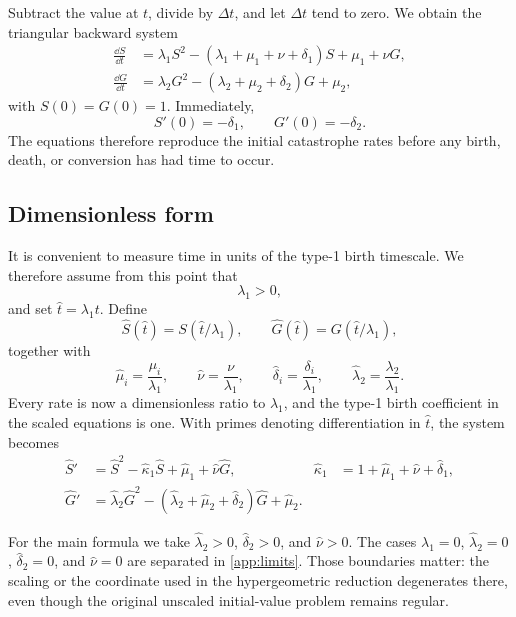 Subtract the value at $t$, divide by $\Delta t$, and let $\Delta t$ tend to zero. We obtain the triangular backward system
\begin{subequations}
\label{eq:backward-unscaled}
\begin{align}
\frac{\dd S}{\dd t}
&=\lambda_1S^2-(\lambda_1+\mu_1+\nu+\delta_1)S
+\mu_1+\nu G,\label{eq:S-unscaled}\\
\frac{\dd G}{\dd t}
&=\lambda_2G^2-(\lambda_2+\mu_2+\delta_2)G
+\mu_2,\label{eq:G-unscaled}
\end{align}
\end{subequations}
with $S(0)=G(0)=1$. Immediately,
\begin{equation}
\label{eq:initial-slopes}
S'(0)=-\delta_1,
\qquad
G'(0)=-\delta_2.
\end{equation}
The equations therefore reproduce the initial catastrophe rates before any birth, death, or conversion has had time to occur.

\subsection{Dimensionless form}

It is convenient to measure time in units of the type-1 birth timescale. We therefore assume from this point that
\begin{equation}
\label{eq:lambda1-positive}
\lambda_1>0,
\end{equation}
and set $\hat t=\lambda_1t$. Define
\begin{equation*}
\widehat S(\hat t)=S(\hat t/\lambda_1),
\qquad
\widehat G(\hat t)=G(\hat t/\lambda_1),
\end{equation*}
together with
\begin{equation}
\label{eq:scaled-rates}
\hat\mu_i=\frac{\mu_i}{\lambda_1},
\qquad
\hat\nu=\frac{\nu}{\lambda_1},
\qquad
\hat\delta_i=\frac{\delta_i}{\lambda_1},
\qquad
\hat\lambda_2=\frac{\lambda_2}{\lambda_1}.
\end{equation}
Every rate is now a dimensionless ratio to $\lambda_1$, and the type-1 birth coefficient in the scaled equations is one. With primes denoting differentiation in $\hat t$, the system becomes
\begin{subequations}
\label{eq:backward-scaled}
\begin{align}
\widehat S'
&=\widehat S^2-\hat\kappa_1\widehat S
+\hat\mu_1+\hat\nu\widehat G,
&\hat\kappa_1&=1+\hat\mu_1+\hat\nu+\hat\delta_1,
\label{eq:S-scaled}\\
\widehat G'
&=\hat\lambda_2\widehat G^2
-(\hat\lambda_2+\hat\mu_2+\hat\delta_2)\widehat G
+\hat\mu_2.
\label{eq:G-scaled}
\end{align}
\end{subequations}

For the main formula we take $\hat\lambda_2>0$, $\hat\delta_2>0$, and $\hat\nu>0$. The cases $\lambda_1=0$, $\hat\lambda_2=0$, $\hat\delta_2=0$, and $\hat\nu=0$ are separated in \cref{app:limits}. Those boundaries matter: the scaling or the coordinate used in the hypergeometric reduction degenerates there, even though the original unscaled initial-value problem remains regular.

\FloatBarrier
